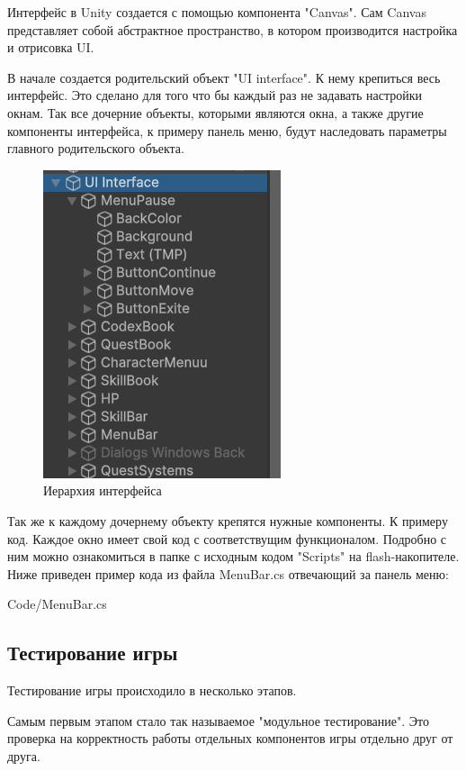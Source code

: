 \documentclass[bachelor, och, coursework, times]{SCWorks}
\begin{document}
    Интерфейс в Unity создается с помощью компонента "Canvas"\cite{search6}. Сам Canvas представляет 
    собой абстрактное пространство, 
    в котором производится настройка и отрисовка UI.

    В начале создается родительский объект "UI interface". К нему крепиться весь интерфейс.
    Это сделано для того что бы каждый раз не задавать настройки окнам. Так 
    все дочерние объекты, которыми являются окна, а также другие
    компоненты интерфейса, к примеру панель меню, будут наследовать
    параметры главного родительского объекта.


     \begin{figure} [H]
        \centering
    \includegraphics[width=0.50\linewidth]{Pictures/Снимок экрана 2025-06-25 205359.png}
    \caption{Иерархия интерфейса}
    \label{fig:Textures}
    \end{figure}

    Так же к каждому дочернему объекту крепятся нужные компоненты. К примеру код.
    Каждое окно имеет свой код с соответствущим функционалом. Подробно с ним можно
    ознакомиться в папке с исходным кодом "Scripts" на flash-накопителе.
    Ниже приведен пример кода из файла MenuBar.cs отвечающий за панель меню:
    
     {Code/MenuBar.cs}


    \subsection{Тестирование игры}

    Тестирование игры происходило в несколько этапов.

    Самым первым этапом стало так называемое "модульное тестирование"\cite{test}.
    Это проверка на корректность работы отдельных компонентов игры отдельно друг от друга.
\end{document}
